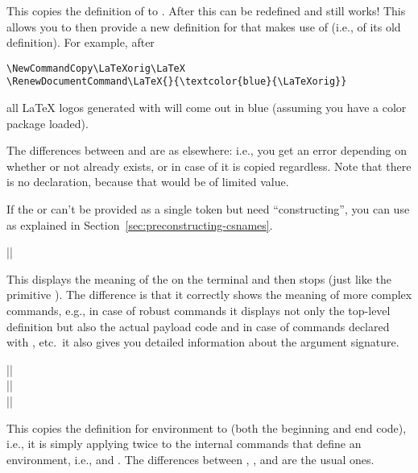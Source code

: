 \documentclass{ltxguide}
\begin{document}
This copies the definition of  to . After
this  can be redefined and 
still works! This allows you to then provide a new definition for
 that makes use of  (i.e., of its old
definition). For example, after
\begin{verbatim}
\NewCommandCopy\LaTeXorig\LaTeX
\RenewDocumentCommand\LaTeX{}{\textcolor{blue}{\LaTeXorig}}
\end{verbatim}
all \LaTeX{} logos generated with  will come out in blue
(assuming you have a color package loaded).

The differences between  and  are as
elsewhere: i.e., you get an error depending on whether or not
 already exists, or in case of  it is copied
regardless. Note that there is no  declaration, because
that would be of limited value.


If the  or  can't be provided as a single
token but need \enquote{constructing}, you can use 
as explained in
Section~\ref{sec:preconstructing-csnames}.

\begin{decl}
  |\ShowCommand|       
\end{decl}

This displays the meaning of the  on the terminal and then
stops (just like the primitive ). The difference is that it
correctly shows the meaning of more complex commands, e.g., in case of
robust commands it displays not only the top-level definition but
also the actual payload code and in case of commands declared with
, etc.\ it also gives you detailed information
about the argument signature.

\begin{decl}
  |\NewEnvironmentCopy|         \\
  |\RenewEnvironmentCopy|       \\
  |\DeclareEnvironmentCopy|    
\end{decl}

This copies the definition for environment  to
 (both the beginning and end code), i.e., it is simply
applying  twice to the internal commands that
define an environment, i.e., \cs{} and .
The differences between , , and
 are the usual ones.
\end{document}
